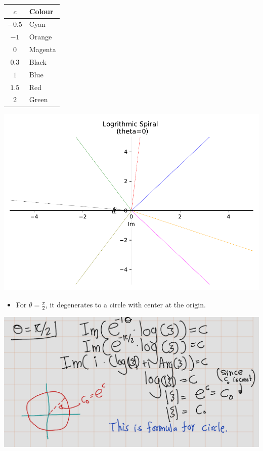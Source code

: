 \documentclass[
]{book}
\providecommand{\tightlist}{%
  \setlength{\itemsep}{0pt}\setlength{\parskip}{0pt}}
\theoremstyle{definition}
\theoremstyle{definition}
\theoremstyle{definition}
\theoremstyle{definition}
\theoremstyle{remark}
\begin{document}
\begin{longtable}[]{@{}cl@{}}
\toprule\noalign{}
\(c\) & Colour \\
\midrule\noalign{}
\endhead
\bottomrule\noalign{}
\endlastfoot
\(-0.5\) & Cyan \\
\(-1\) & Orange \\
\(0\) & Magenta \\
\(0.3\) & Black \\
\(1\) & Blue \\
\(1.5\) & Red \\
\(2\) & Green \\
\end{longtable}

\includegraphics{ConformalMapping_files/figure-latex/unnamed-chunk-69-1.pdf}

\begin{itemize}
\tightlist
\item
  For \(\theta = \frac{\pi}{2}\), it degenerates to a circle with center at the origin.
\end{itemize}

\includegraphics[width=20.99in]{figures/Helical_Domain/fig3}
\end{document}
